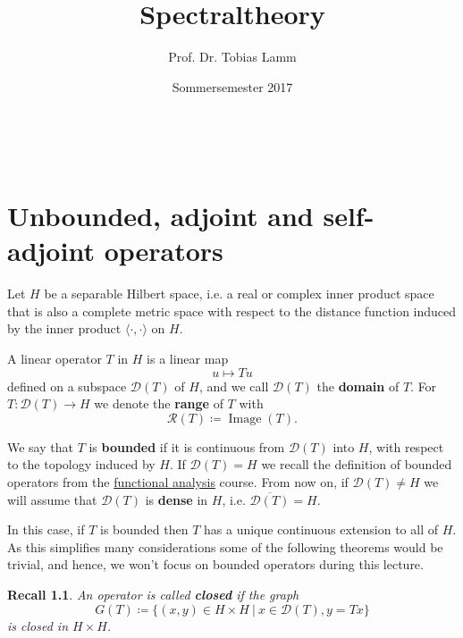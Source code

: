 \documentclass[12pt]{extreport} %
\title{Spectraltheory}
\author{Prof. Dr. Tobias Lamm}
\date{Sommersemester 2017}
\makeatletter
\newcommand{\DO}[1]{\mathcal{D}\left( {#1} \right)}
\newcommand{\RO}[1]{\mathcal{R}\left( {#1} \right)}
\theoremstyle{named}
\theoremstyle{nnamed}
\theoremstyle{itshape}
\theoremstyle{normal}
\newtheorem*{recall}{Recall}
\def\maketitle{ \begin{titlepage} 
			~\vspace{3cm} 
		\begin{center} {\Huge \@title} \end{center} 
	 		\vspace*{1cm} 
	 	\begin{center} {\large \@author} \end{center} 
	 	\vspace*{-0.5cm}
	 	\begin{center} \@date \end{center} 
	 		\vspace*{7cm} 
	 	\begin{center} \@publishers \end{center} 
	 		\vfill 
	\end{titlepage} }
\makeatother
\begin{document}
\begin{titlepage}
	\maketitle
	\thispagestyle{empty}
\end{titlepage}

\tableofcontents
\thispagestyle{empty}


\chapter{Unbounded, adjoint and self-adjoint operators}


Let $H$ be a separable Hilbert space, i.e. a real or complex inner product space that is also a complete metric space with respect to the distance function induced by the inner product $\langle \cdot, \cdot \rangle$ on $H$. ~\bigskip

 
A linear operator $T$ in $H$ is a linear map 
	$$ u \mapsto Tu $$
defined on a subspace $\DO{T}$ of $H$, and we call $\DO{T}$ the \textbf{domain} of $T$. For $T \colon \DO{T} \rightarrow H$ we denote the \textbf{range} of $T$ with
$$ \RO{T} \coloneqq \operatorname{Image}\left( T \right). $$

 
We say that $T$ is \textbf{bounded} if it is continuous from $\DO{T}$ into $H$, with respect to the topology induced by $H$. If $\DO{T} = H$ we recall the definition of bounded operators from the \href{https://github.com/MBelica/Funktionalanalysis-WS2015}{functional analysis} course. From now on, if $\DO{T} \neq H$ we will assume that $\DO{T}$ is \textbf{dense} in $H$, i.e. $\overline{\DO{T}} = H$.  ~\bigskip

 In this case, if $T$ is bounded then $T$ has a unique continuous extension to all of $H$. As this simplifies many considerations some of the following theorems would be trivial, and hence, we won't focus on bounded operators during this lecture.
\newpage

\begin{recall}   
	An operator is called \textbf{closed} if the graph 
	$$ G(T) \coloneqq \big\{ (x, y) \in H \times H ~ \big| ~ x \in \DO{T}, y = Tx \big\} $$
	is closed in $H \times H$.
\end{recall}
\end{document}
